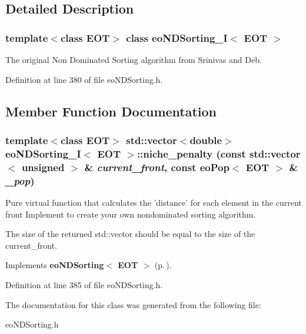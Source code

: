 \subsection{Detailed Description}
\subsubsection*{template$<$class EOT$>$ class eo\-NDSorting\_\-I$<$ EOT $>$}

The original Non Dominated Sorting algorithm from Srinivas and Deb. 



Definition at line 380 of file eo\-NDSorting.h.

\subsection{Member Function Documentation}
\subsubsection{\setlength{\rightskip}{0pt plus 5cm}template$<$class EOT$>$ std::vector$<$double$>$ {\bf eo\-NDSorting\_\-I}$<$ {\bf EOT} $>$::niche\_\-penalty (const std::vector$<$ unsigned $>$ \& {\em current\_\-front}, const {\bf eo\-Pop}$<$ {\bf EOT} $>$ \& {\em \_\-pop})\hspace{0.3cm}{\tt  [inline, virtual]}}\label{classeo_n_d_sorting___i_a1}


Pure virtual function that calculates the 'distance' for each element in the current front Implement to create your own nondominated sorting algorithm. 

The size of the returned std::vector should be equal to the size of the current\_\-front. 

Implements {\bf eo\-NDSorting$<$ EOT $>$} {\rm (p.\,\pageref{classeo_n_d_sorting_a2})}.

Definition at line 385 of file eo\-NDSorting.h.

The documentation for this class was generated from the following file:\begin{CompactItemize}
\item 
eo\-NDSorting.h\end{CompactItemize}
